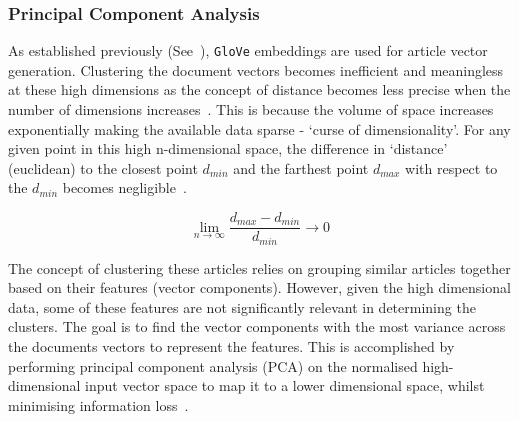 \subsubsection{Principal Component Analysis}

As established previously (See~), \texttt{GloVe} embeddings are used for article vector generation. Clustering the document vectors becomes inefficient and meaningless at these high dimensions as the concept of distance becomes less precise when the number of dimensions increases~\cite{pca_clustering}. This is because the volume of space increases exponentially making the available data sparse - `curse of dimensionality'. For any given point in this high n-dimensional space, the difference in `distance' (euclidean) to the closest point $d_{min}$ and the farthest point $d_{max}$ with respect to the $d_{min}$ becomes negligible~\cite{nearest_neighbour}. 

\[ \lim_{n\to\infty} \frac{d_{max} - d_{min}}{d_{min}} \to0\]

The concept of clustering these articles relies on grouping similar articles together based on their features (vector components). However, given the high dimensional data, some of these features are not significantly relevant in determining the clusters. The goal is to find the vector components with the most variance across the documents vectors to represent the features. This is accomplished by performing principal component analysis (PCA) on the normalised high-dimensional input vector space to map it to a lower dimensional space, whilst minimising information loss~\cite{pca_clustering}.

